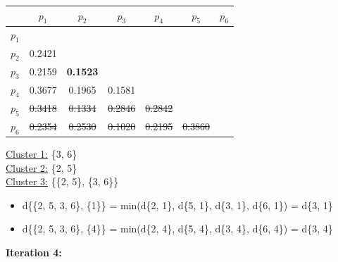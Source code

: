 \documentclass[11pt]{article}
\begin{document}
	\begin{center}
    	\begin{adjustbox}{max width=\textwidth}
		\begin{tabular}{ | c | c | c | c | c | c | c |}
	  	 	\hline

	  	 	& \textbf{$p_1$} & \textbf{$p_2$} & \textbf{$p_3$} & \textbf{$p_4$} & \textbf{$p_5$} & \textbf{$p_6$}\\
	  	 	\hline
	  	 	
	  	 	\textbf{$p_1$} &  &  &  &  &  &\\
	  	 	\hline
	  	 	
	  	 	\textbf{$p_2$} & 0.2421 &  &  &  &  &  \\
	  	 	\hline
	  	 	
	  	 	\textbf{$p_3$} & 0.2159 & \textbf{0.1523} &  &  &  & \\
	  	 	\hline
	  	 	
	  	 	\textbf{$p_4$} & 0.3677 & 0.1965 & 0.1581 &  &  & \\
	  	 	\hline
	  	 	
	  	 	\textbf{$p_5$} & \st{0.3418} & \st{0.1334} & \st{0.2846} & \st{0.2842} &  & \\
	  	 	\hline	
	  	 	
	  	 	\textbf{$p_6$} & \st{0.2354} & \st{0.2530} & \st{0.1020} & \st{0.2195} & \st{0.3860} & \\
	  	 	\hline			
    		\end{tabular}
    	\end{adjustbox}
	\end{center}
	
	\underline{Cluster 1:} \{3, 6\} \\
	\underline{Cluster 2:} \{2, 5\} \\
	\underline{Cluster 3:} \{\{2, 5\}, \{3, 6\}\} 
	
	\begin{itemize}
		\item d\{\{2, 5, 3, 6\}, \{1\}\} = min(d\{2, 1\}, d\{5, 1\}, d\{3, 1\}, d\{6, 1\}) = d\{3, 1\}
		\item d\{\{2, 5, 3, 6\}, \{4\}\} = min(d\{2, 4\}, d\{5, 4\}, d\{3, 4\}, d\{6, 4\}) = d\{3, 4\}
	\end{itemize}
	
	
	\vspace{5mm}
	
	\textbf{Iteration 4:}
	
\end{document}
